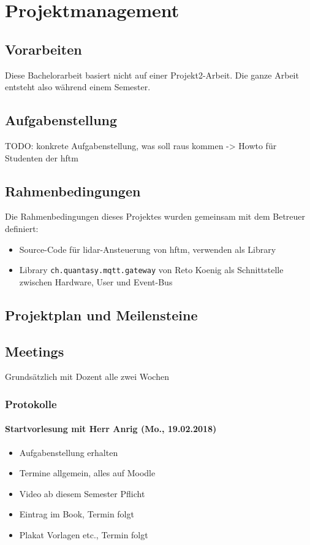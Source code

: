 \chapter{Projektmanagement}
\section{Vorarbeiten}
Diese Bachelorarbeit basiert nicht auf einer Projekt2-Arbeit. Die ganze Arbeit entsteht also während einem Semester.

\section{Aufgabenstellung}
\label{sec:aufgabenstellung-messbar}
TODO:
konkrete Aufgabenstellung, was soll raus kommen -> Howto für Studenten der \acrshort{hftm}

\section{Rahmenbedingungen}
Die Rahmenbedingungen dieses Projektes wurden gemeinsam mit dem Betreuer definiert:
\begin{itemize}
	\item Source-Code für \acrshort{lidar}-Ansteuerung von \acrshort{hftm}, verwenden als Library
	\item Library \verb|ch.quantasy.mqtt.gateway|\cite{ch.quantasy.mqtt.gateway} von Reto Koenig als Schnittstelle zwischen Hardware, User und Event-Bus
\end{itemize}

\section{Projektplan und Meilensteine}

\section{Meetings}
Grundsätzlich mit Dozent alle zwei Wochen
\subsection{Protokolle}
\subsubsection{Startvorlesung mit Herr Anrig (Mo., 19.02.2018)}
\begin{itemize}
	\item Aufgabenstellung erhalten
	\item Termine allgemein, alles auf Moodle
	\item Video ab diesem Semester Pflicht
	\item Eintrag im Book, Termin folgt
	\item Plakat Vorlagen etc., Termin folgt
\end{itemize}

